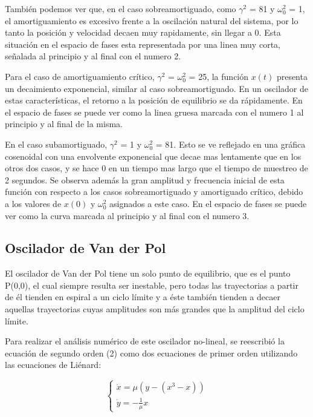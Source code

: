 \documentclass[a4paper,12pt]{article}
\begin{document}
Tambi\'en podemos ver que, en el caso sobreamortiguado, como $\gamma^2$ = 81 y $\omega_0^2$ = 1, el amortiguamiento es excesivo frente a la oscilaci\'on natural del sistema, por lo tanto la posici\'on y velocidad decaen muy rapidamente, sin llegar a 0. Esta situaci\'on en el espacio de fases esta representada por una linea muy corta, se\~nalada al principio y al final con el numero 2.

Para el caso de amortiguamiento cr\'itico, $\gamma^2$ = $\omega_0^2$ = 25, la funci\'on $x(t)$ presenta un decaimiento exponencial, similar al caso sobreamortiguado. En un oscilador de estas caracter\'isticas, el retorno a la posici\'on de equilibrio se da r\'apidamente. En el espacio de fases se puede ver como la linea gruesa marcada con el numero 1 al principio y al final de la misma.

En el caso subamortiguado, $\gamma^2$ = 1 y $\omega_0^2$ = 81. Esto se ve reflejado en una gr\'afica cosenoidal con una envolvente exponencial que decae mas lentamente que en los otros dos casos, y se hace 0 en un tiempo mas largo que el tiempo de muestreo de 2 segundos. \newline
Se observa adem\'as la gran amplitud y frecuencia inicial de esta funci\'on con respecto a los casos sobreamortiguado y amortiguado cr\'itico, debido a los valores de ${x}(0)$ y $\omega_0^2$ asignados a este caso. En el espacio de fases se puede ver como la curva marcada al principio y al final con el numero 3.


\subsection{Oscilador de Van der Pol}

El oscilador de Van der Pol tiene un solo punto de equilibrio, que es el punto P(0,0), el cual siempre resulta ser inestable, pero todas las trayectorias a partir de \'el tienden en espiral a un ciclo l\'imite y a \'este tambi\'en tienden a decaer aquellas trayectorias cuyas amplitudes son m\'as grandes que la amplitud del ciclo l\'imite.

Para realizar el an\'alisis num\'erico de este oscilador no-lineal, se reescribi\'o la ecuaci\'on de segundo orden (2) como dos ecuaciones de primer orden utilizando las ecuaciones de Li\'enard:

$$ \begin{cases} \dot{x} = \mu (y-(x^3-x)) \\ \dot{y} = -\frac{1}{\mu}x \end{cases} $$
\end{document}
